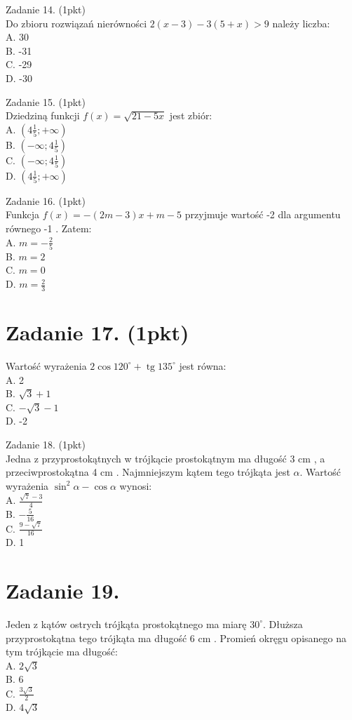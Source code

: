 \documentclass[10pt]{article}
\begin{document}
Zadanie 14. (1pkt)\\
Do zbioru rozwiązań nierówności \(2(x-3)-3(5+x)>9\) należy liczba:\\
A. 30\\
B. -31\\
C. -29\\
D. -30

Zadanie 15. (1pkt)\\
Dziedziną funkcji \(f(x)=\sqrt{21-5 x}\) jest zbiór:\\
A. \(\left(4 \frac{1}{5} ;+\infty\right)\)\\
B. \(\left(-\infty ; 4 \frac{1}{5}\right)\)\\
C. \(\left(-\infty ; 4 \frac{1}{5}\right)\)\\
D. \(\left(4 \frac{1}{5} ;+\infty\right)\)

Zadanie 16. (1pkt)\\
Funkcja \(f(x)=-(2 m-3) x+m-5\) przyjmuje wartość -2 dla argumentu równego -1 . Zatem:\\
A. \(m=-\frac{2}{5}\)\\
B. \(m=2\)\\
C. \(m=0\)\\
D. \(m=\frac{2}{3}\)

\section*{Zadanie 17. (1pkt)}
Wartość wyrażenia \(2 \cos 120^{\circ}+\operatorname{tg} 135^{\circ}\) jest równa:\\
A. 2\\
B. \(\sqrt{3}+1\)\\
C. \(-\sqrt{3}-1\)\\
D. -2

Zadanie 18. (1pkt)\\
Jedna z przyprostokątnych w trójkącie prostokątnym ma długość 3 cm , a przeciwprostokątna 4 cm . Najmniejszym kątem tego trójkąta jest \(\alpha\). Wartość wyrażenia \(\sin ^{2} \alpha-\cos \alpha\) wynosi:\\
A. \(\frac{\sqrt{7}-3}{4}\)\\
B. \(-\frac{5}{16}\)\\
C. \(\frac{9-\sqrt{7}}{16}\)\\
D. 1

\section*{Zadanie 19.}
Jeden z kątów ostrych trójkąta prostokątnego ma miarę \(30^{\circ}\). Dłuższa przyprostokątna tego trójkąta ma długość 6 cm . Promień okręgu opisanego na tym trójkącie ma długość:\\
A. \(2 \sqrt{3}\)\\
B. 6\\
C. \(\frac{3 \sqrt{3}}{2}\)\\
D. \(4 \sqrt{3}\)
\end{document}
